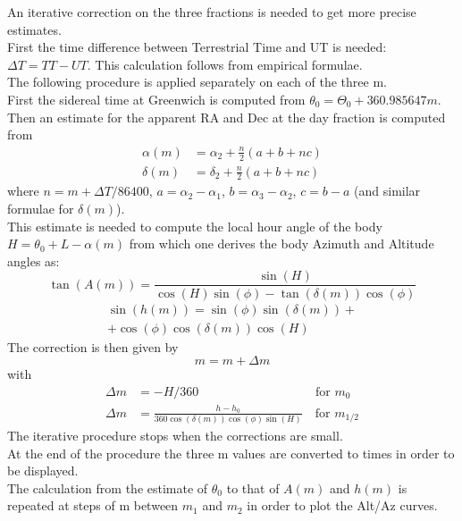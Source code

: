\documentclass[a4paper]{article}
\begin{document}
\begin{multicols}{2}
		An iterative correction on the three fractions is needed to get more precise estimates.\\
		First the time difference between Terrestrial Time and UT is needed: $\Delta T = TT - UT$. This calculation follows from empirical formulae.\\
		The following procedure is applied separately on each of the three m.\\
		First the sidereal time at Greenwich is computed from $\theta_0 = \Theta_0 + 360.985647m$.\\
		Then an estimate for the apparent RA and Dec at the day fraction is computed from
		\begin{align}
			\alpha(m) &= \alpha_2 + \frac{n}{2}(a + b + nc)\\
			\delta(m) &= \delta_2 + \frac{n}{2}(a + b + nc)
		\end{align}
		where $n = m + \Delta T/86400$, $a = \alpha_2 - \alpha_1$, $b = \alpha_3 - \alpha_2$, $c = b - a$ (and similar formulae for $\delta(m)$).\\
		This estimate is needed to compute the local hour angle of the body $H = \theta_0 + L - \alpha(m)$ from which one derives the body Azimuth and Altitude angles as:
		\begin{equation}
			\tan(A(m)) = \frac{\sin(H)}{\cos(H)\sin(\phi)-\tan(\delta(m))\cos(\phi)}
		\end{equation}
		\begin{multline}
			\sin(h(m)) = \sin(\phi)\sin(\delta(m)) + \\+\cos(\phi)\cos(\delta(m))\cos(H)
		\end{multline}
		\vfill\null
		\columnbreak
		The correction is then given by
		\begin{equation}
			m = m + \Delta m
		\end{equation}
		with
		\begin{align}
			\Delta m &= - H/360 \qquad\qquad\qquad\quad\quad\quad\textrm{ for }m_0\\
			\Delta m &= \frac{h - h_0}{360\cos(\delta(m))\cos(\phi)\sin(H)} \quad\textrm{for }m_{1/2}
		\end{align}
		The iterative procedure stops when the corrections are small.\\
		
		At the end of the procedure the three m values are converted to times in order to be displayed.\\
		The calculation from the estimate of $\theta_0$ to that of $A(m)$ and $h(m)$ is repeated at steps of m between $m_1$ and $m_2$ in order to plot the Alt/Az curves.
	\end{multicols}
	\vspace{0.4\textheight}
\end{document}
